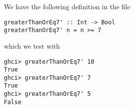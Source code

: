 
We have the following definition in the file 
\begin{verbatim}
greaterThanOrEq7' :: Int -> Bool
greaterThanOrEq7' n = n >= 7
\end{verbatim}
which we test with
\begin{verbatim}
ghci> greaterThanOrEq7' 10
True
ghci> greaterThanOrEq7' 7
True
ghci> greaterThanOrEq7' 5
False
\end{verbatim}
